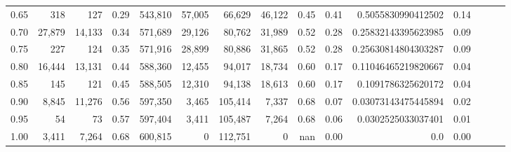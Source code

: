 \begin{tabular}{rrrrrrrrrrrrrrr}
0.65 &     318 &     127 &  0.29 &  543,810 &   57,005 &   66,629 &   46,122 &  0.45 &  0.41 &   0.5055830990412502 &      0.14 \\
0.70 &  27,879 &  14,133 &  0.34 &  571,689 &   29,126 &   80,762 &   31,989 &  0.52 &  0.28 &  0.25832143395623985 &      0.09 \\
0.75 &     227 &     124 &  0.35 &  571,916 &   28,899 &   80,886 &   31,865 &  0.52 &  0.28 &  0.25630814804303287 &      0.09 \\
0.80 &  16,444 &  13,131 &  0.44 &  588,360 &   12,455 &   94,017 &   18,734 &  0.60 &  0.17 &  0.11046465219820667 &      0.04 \\
0.85 &     145 &     121 &  0.45 &  588,505 &   12,310 &   94,138 &   18,613 &  0.60 &  0.17 &   0.1091786325620172 &      0.04 \\
0.90 &   8,845 &  11,276 &  0.56 &  597,350 &    3,465 &  105,414 &    7,337 &  0.68 &  0.07 &  0.03073143475445894 &      0.02 \\
0.95 &      54 &      73 &  0.57 &  597,404 &    3,411 &  105,487 &    7,264 &  0.68 &  0.06 &   0.0302525033037401 &      0.01 \\
1.00 &   3,411 &   7,264 &  0.68 &  600,815 &        0 &  112,751 &        0 &   nan &  0.00 &                  0.0 &      0.00 \\
\bottomrule
\end{tabular}
